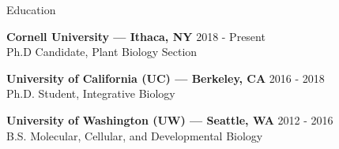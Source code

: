 \documentclass{resume} %
\begin{document}

\begin{rSection}{Education}

\textbf{Cornell University --- Ithaca, NY} \hfill 2018 - Present
\\Ph.D Candidate,  Plant Biology Section

\textbf{University of California (UC) ---  Berkeley, CA} \hfill 2016 - 2018
\\Ph.D. Student, Integrative Biology

\textbf{University of Washington (UW) ---  Seattle, WA} \hfill 2012 - 2016 
\\B.S. Molecular, Cellular, and Developmental Biology 

\end{rSection}
\end{document}
